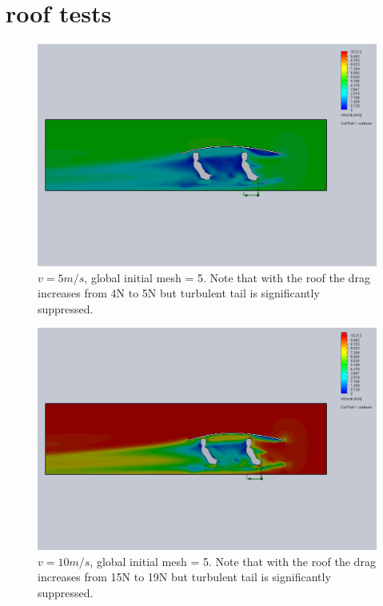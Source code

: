 \documentclass[11pt]{article}
\begin{document}
\clearpage

\section{roof tests}

\begin{figure}[ht]
\includegraphics[width=\textwidth]{gm_5_rf_7_v05_roof1.png}
\caption{$v = 5 m/s$, global initial mesh = 5. Note that with the roof the drag increases from 4N to 5N but turbulent tail is significantly suppressed.}
\end{figure}

\begin{figure}[ht]
\includegraphics[width=\textwidth]{gm_5_rf_7_v10_roof1.png}
\caption{$v = 10 m/s$, global initial mesh = 5. Note that with the roof the drag increases from 15N to 19N but turbulent tail is significantly suppressed.}
\end{figure}
\end{document}
